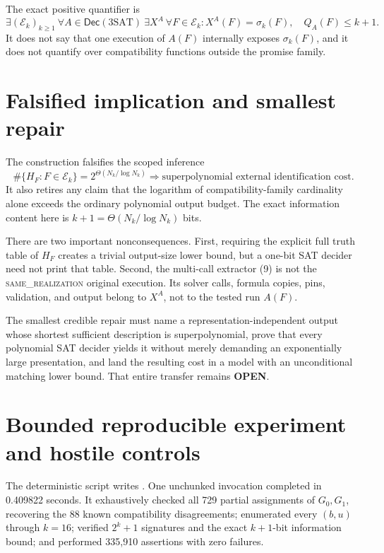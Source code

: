 \documentclass[11pt]{article}
\newcommand{\OPEN}{\textbf{OPEN}}
\newcommand{\same}{\textsc{same\_realization}}
\begin{document}
The exact positive quantifier is
\[
 \exists(\mathcal E_k)_{k\ge1}\ \forall A\in\mathsf{Dec}(3\mathrm{SAT})\
 \exists X^A\ \forall F\in\mathcal E_k:
 X^A(F)=\sigma_k(F),\quad Q_A(F)\le k+1.                           \tag{9}
\]
It does not say that one execution of \(A(F)\) internally exposes
\(\sigma_k(F)\), and it does not quantify over compatibility functions
outside the promise family.

\section{Falsified implication and smallest repair}
The construction falsifies the scoped inference
\[
 \#\{H_F:F\in\mathcal E_k\}=2^{\Theta(N_k/\log N_k)}
 \Longrightarrow
 \text{superpolynomial external identification cost}.             \tag{10}
\]
It also retires any claim that the logarithm of compatibility-family
cardinality alone exceeds the ordinary polynomial output budget.  The exact
information content here is \(k+1=\Theta(N_k/\log N_k)\) bits.

There are two important nonconsequences.  First, requiring the explicit full
truth table of \(H_F\) creates a trivial output-size lower bound, but a
one-bit SAT decider need not print that table.  Second, the multi-call
extractor (9) is not the \same{} original execution.  Its solver calls,
formula copies, pins, validation, and output belong to \(X^A\), not to the
tested run \(A(F)\).

The smallest credible repair must name a representation-independent output
whose shortest sufficient description is superpolynomial, prove that every
polynomial SAT decider yields it without merely demanding an exponentially
large presentation, and land the resulting cost in a model with an
unconditional matching lower bound.  That entire transfer remains \OPEN.

\section{Bounded reproducible experiment and hostile controls}
The deterministic script
writes
.
One unchunked invocation completed in 0.409822 seconds.  It exhaustively
checked all 729 partial assignments of \(G_0,G_1\), recovering the 88 known
compatibility disagreements; enumerated every \((b,u)\) through \(k=16\);
verified \(2^k+1\) signatures and the exact \(k+1\)-bit information bound;
and performed 335,910 assertions with zero failures.
\end{document}
